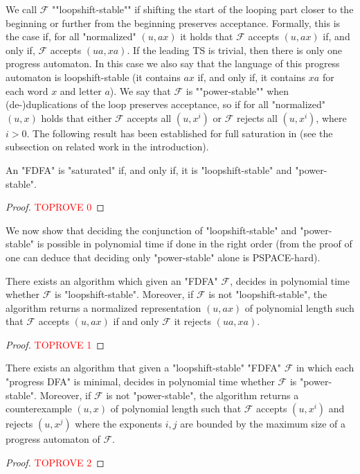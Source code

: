 \documentclass[a4paper,USenglish,cleveref,autoref,thm-restate]{lipics-v2021}
\newcommand{\mc}[1]{\ensuremath{\mathcal{#1}}}
\newcommand{\F}{\mc{F}}
\newcommand{\PSPACE}{\textsf{PSPACE}\xspace}
\begin{document}
\AP
We call $\F$ ""loopshift-stable"" if shifting the start of the looping part closer to the beginning or further from the beginning preserves acceptance.
Formally, this is the case if, for all "normalized" $(u,ax)$ it holds that $\F$ accepts $(u,ax)$ if, and only if, $\F$ accepts $(ua,xa)$. If the leading TS is trivial, then there is only one progress automaton. In this case we also say that the language of this progress automaton is loopshift-stable (it contains $ax$ if, and only if, it contains $xa$ for each word $x$ and letter $a$).
\AP
We say that $\F$ is ""power-stable"" when (de-)duplications of the loop preserves acceptance, so if for all "normalized" $(u,x)$ holds that either $\F$ accepts all $(u,x^i)$ or $\F$ rejects all $(u,x^i)$, where $i > 0$.
The following result has been established for full saturation in \cite{CianciaV12,CianciaV19} (see the subsection on related work in the introduction).

\begin{lemma}
  An "FDFA" is "saturated" if, and only if, it is "loopshift-stable" and "power-stable".\label{lemma:fdfasaturationcharacterisation}
\end{lemma}
\begin{proof}\textcolor{red}{TOPROVE 0}\end{proof}
We now show that deciding the conjunction of "loopshift-stable" and "power-stable" is possible in polynomial time if done in the right order (from the proof of  one can deduce that deciding only "power-stable" alone is \PSPACE-hard). 
\begin{lemma}
    There exists an algorithm which given an "FDFA" $\F$, decides in polynomial time whether $\F$ is "loopshift-stable".
    Moreover, if $\F$ is not "loopshift-stable", the algorithm returns a normalized representation $(u,ax)$ of polynomial length such that $\F$ accepts $(u,ax)$ if and only $\F$ it rejects $(ua,xa)$.
  \label{lemma:rotationinvariancedecidable}
\end{lemma}
\begin{proof}\textcolor{red}{TOPROVE 1}\end{proof}



\begin{lemma}
There exists an algorithm that given a "loopshift-stable" "FDFA" $\F$ in which each "progress DFA" is minimal, decides in polynomial time whether $\F$ is "power-stable".
  Moreover, if $\F$ is not "power-stable", the algorithm returns a counterexample $(u,x)$ of polynomial length such that $\F$ accepts $(u,x^i)$ and rejects $(u,x^j)$ where the exponents $i,j$ are bounded by the maximum size of a progress automaton of $\F$.\label{lemma:rotationinvarianceproperty}
\end{lemma}
\begin{proof}\textcolor{red}{TOPROVE 2}\end{proof}
\end{document}
